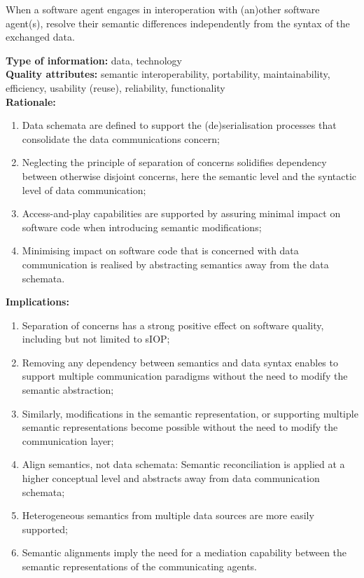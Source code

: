 \documentclass[sort&compress,preprint,authoryear,3p,twocolumn]{elsarticle}
\begin{document}
\begin{mmdp}\label{dp:ssoc}

When a software agent engages in interoperation with (an)other software agent(s), resolve their semantic differences independently from the syntax of the exchanged data.   

\textbf{Type of information:} data, technology  \\
\textbf{Quality attributes:} semantic interoperability, portability, maintainability, efficiency, usability (reuse), reliability, functionality   \\
\textbf{Rationale:}
\begin{enumerate}
  \item Data schemata are defined to support the (de)serialisation processes that consolidate the data communications concern;
  \item Neglecting the principle of separation of concerns solidifies dependency between otherwise disjoint concerns, here the semantic level and the syntactic level of data communication;
  \item Access-and-play capabilities are supported by assuring minimal impact on software code when introducing semantic modifications;
  \item Minimising impact on software code that is concerned with data communication is realised by abstracting semantics away from the data schemata.
\end{enumerate}
\textbf{Implications:}
\begin{enumerate}
  \item Separation of concerns has a strong positive effect on software quality, including but not limited to sIOP;
  \item Removing any dependency between semantics and data syntax enables to support multiple communication paradigms without the need to modify the semantic abstraction;
  \item Similarly, modifications in the semantic representation, or supporting multiple semantic representations become possible without the need to modify the communication layer;
  \item Align semantics, not data schemata: Semantic reconciliation is applied at a higher conceptual level and abstracts away from data communication schemata;
  \item Heterogeneous semantics from multiple data sources are more easily supported;
  \item Semantic alignments imply the need for a mediation capability between the semantic representations of the communicating agents.
\end{enumerate}  
\end{mmdp}
\end{document}
